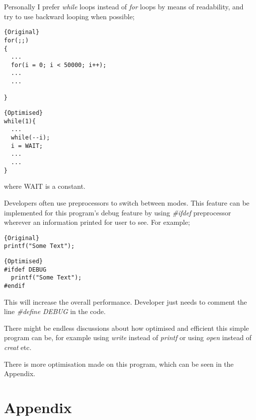 \documentclass[11pt]{article}
\begin{document}
Personally I prefer \textit{while} loops instead of \textit{for} loops by means of readability, and try to use backward looping when possible;

\noindent\begin{minipage}{.45\textwidth}
\begin{lstlisting}[caption=Original,frame=tlrb]{Original}
for(;;)
{
  ...
  for(i = 0; i < 50000; i++);
  ...
  ...

}
\end{lstlisting}
\end{minipage}\hfill
\begin{minipage}{.50\textwidth}
\begin{lstlisting}[caption=Optimised,frame=tlrb]{Optimised}
while(1){
  ...
  while(--i);
  i = WAIT;
  ...
  ...
}
\end{lstlisting}
\end{minipage}
where WAIT is a constant.

Developers often use preprocessors to switch between modes. This feature can be implemented for this program's debug feature by using \textit{\#ifdef} preprocessor wherever an information printed for user to see. For example;

\noindent\begin{minipage}{.45\textwidth}
\begin{lstlisting}[caption=Original,frame=tlrb]{Original}
printf("Some Text");
\end{lstlisting}
\end{minipage}\hfill
\begin{minipage}{.50\textwidth}
\begin{lstlisting}[caption=Optimised,frame=tlrb]{Optimised}
#ifdef DEBUG
  printf("Some Text");
#endif
\end{lstlisting}
\end{minipage}
This will increase the overall performance. Developer just needs to comment the line \textit{\#define DEBUG} in the code.

There might be endless discussions about how optimised and efficient this simple program can be, for example using \textit{write} instead of \textit{printf} or using \textit{open} instead of \textit{creat} etc. 

There is more optimisation made on this program, which can be seen in the Appendix.
\newpage

\section*{Appendix}
\end{document}
